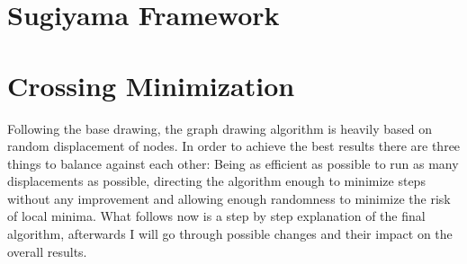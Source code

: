 \documentclass[]{llncs}
\begin{document}
    \section{Sugiyama Framework}

    \section{Crossing Minimization}

Following the base drawing, the graph drawing algorithm is heavily based on random displacement of nodes. In order to achieve the best results there are three things to balance against each other: Being as efficient as possible to run as many displacements as possible, directing the algorithm enough to minimize steps without any improvement and allowing enough randomness to minimize the risk of local minima. What follows now is a step by step explanation of the final algorithm, afterwards I will go through possible changes and their impact on the overall results.
\end{document}
